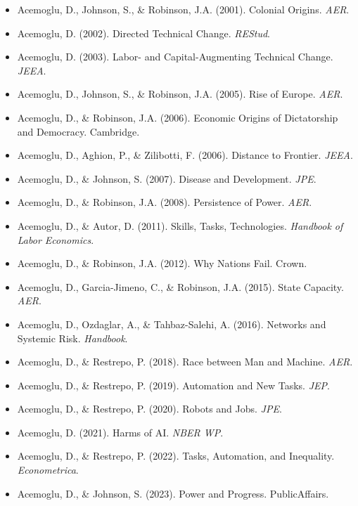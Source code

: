 \begin{itemize}
    \item Acemoglu, D., Johnson, S., \& Robinson, J.A. (2001). Colonial Origins. \textit{AER}.
    \item Acemoglu, D. (2002). Directed Technical Change. \textit{REStud}.
    \item Acemoglu, D. (2003). Labor- and Capital-Augmenting Technical Change. \textit{JEEA}.
    \item Acemoglu, D., Johnson, S., \& Robinson, J.A. (2005). Rise of Europe. \textit{AER}.
    \item Acemoglu, D., \& Robinson, J.A. (2006). Economic Origins of Dictatorship and Democracy. Cambridge.
    \item Acemoglu, D., Aghion, P., \& Zilibotti, F. (2006). Distance to Frontier. \textit{JEEA}.
    \item Acemoglu, D., \& Johnson, S. (2007). Disease and Development. \textit{JPE}.
    \item Acemoglu, D., \& Robinson, J.A. (2008). Persistence of Power. \textit{AER}.
    \item Acemoglu, D., \& Autor, D. (2011). Skills, Tasks, Technologies. \textit{Handbook of Labor Economics}.
    \item Acemoglu, D., \& Robinson, J.A. (2012). Why Nations Fail. Crown.
    \item Acemoglu, D., Garcia-Jimeno, C., \& Robinson, J.A. (2015). State Capacity. \textit{AER}.
    \item Acemoglu, D., Ozdaglar, A., \& Tahbaz-Salehi, A. (2016). Networks and Systemic Risk. \textit{Handbook}.
    \item Acemoglu, D., \& Restrepo, P. (2018). Race between Man and Machine. \textit{AER}.
    \item Acemoglu, D., \& Restrepo, P. (2019). Automation and New Tasks. \textit{JEP}.
    \item Acemoglu, D., \& Restrepo, P. (2020). Robots and Jobs. \textit{JPE}.
    \item Acemoglu, D. (2021). Harms of AI. \textit{NBER WP}.
    \item Acemoglu, D., \& Restrepo, P. (2022). Tasks, Automation, and Inequality. \textit{Econometrica}.
    \item Acemoglu, D., \& Johnson, S. (2023). Power and Progress. PublicAffairs. \citep{acemoglu2023power}
\end{itemize}


